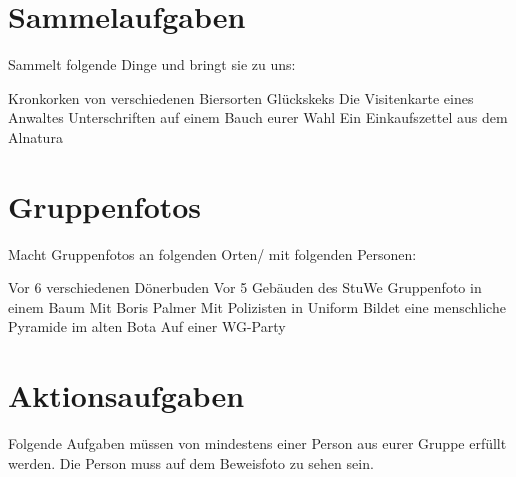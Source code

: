 \documentclass[11pt,paper=a4,answers]{exam}
\renewenvironment{questions}{
	\begin{q}
		\pointsinrightmargin
		\marginpointname{\ Pkt}
		\bracketedpoints }{
	\end{q}}
\begin{document}
\section*{Sammelaufgaben}
	Sammelt folgende Dinge und bringt sie zu uns:
	\begin{questions}
		 Kronkorken von verschiedenen Biersorten
		 Glückskeks
		\question[15] Die Visitenkarte eines Anwaltes
		 Unterschriften auf einem Bauch eurer Wahl
		\question[5] Ein Einkaufszettel aus dem Alnatura
		
	\end{questions}

\section*{Gruppenfotos}
	Macht Gruppenfotos an folgenden Orten/ mit folgenden Personen:
	\begin{questions}
		\question[5] Vor 6 verschiedenen Dönerbuden
		\question[5] Vor 5 Gebäuden des StuWe 
		\question[10] Gruppenfoto in einem Baum
		\question[100] Mit Boris Palmer
		\question[10] Mit Polizisten in Uniform
		\marginpointname{} 
		 Bildet eine menschliche Pyramide im alten Bota
		 Auf einer WG-Party
	
	\end{questions}

\section*{Aktionsaufgaben}
	Folgende Aufgaben müssen von mindestens einer Person aus eurer Gruppe erfüllt werden. Die Person muss auf dem Beweisfoto zu sehen sein.
	
\end{document}
